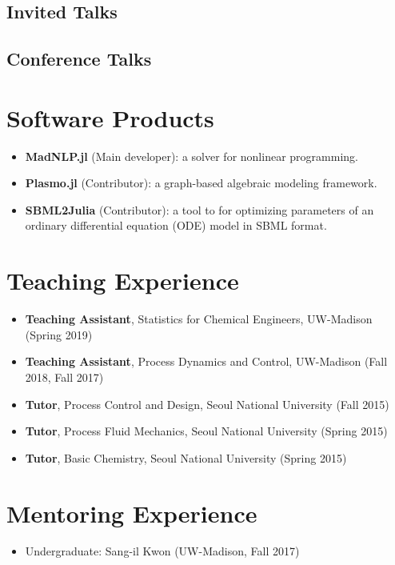 \documentclass{article}
\begin{document}
\subsection*{Invited Talks}
\renewcommand*{\labelenumi}{[I\theenumi]}
\subsection*{Conference Talks}
\renewcommand*{\labelenumi}{[P\theenumi]}

\section*{Software Products}
\begin{itemize}[leftmargin=*]
\item[] {\bf MadNLP.jl} (Main developer): a solver for nonlinear programming.
\item[] {\bf Plasmo.jl} (Contributor): a graph-based algebraic modeling framework.
\item[] {\bf SBML2Julia} (Contributor): a tool to for optimizing parameters of an ordinary differential equation (ODE) model in SBML format.
\end{itemize}

\section*{Teaching Experience}
\begin{itemize}[leftmargin=*]
\item[] {\bf Teaching Assistant}, Statistics for Chemical Engineers, UW-Madison (Spring 2019)
\item[] {\bf Teaching Assistant}, Process Dynamics and Control, UW-Madison (Fall 2018, Fall 2017)
\item[] {\bf Tutor}, Process Control and Design, Seoul National University (Fall 2015)
\item[] {\bf Tutor}, Process Fluid Mechanics, Seoul National University (Spring 2015)
\item[] {\bf Tutor}, Basic Chemistry, Seoul National University (Spring 2015)
\end{itemize}

\section*{Mentoring Experience}
\begin{itemize}[leftmargin=*]
\item[] Undergraduate: Sang-il Kwon (UW-Madison, Fall 2017)
\end{itemize}
\end{document}
